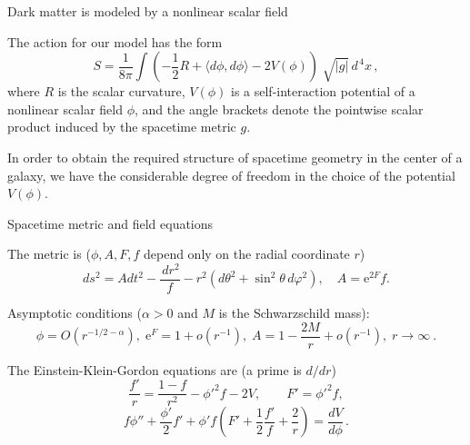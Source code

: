 \documentclass[12pt,aspectratio=139, slidestop,notes=hide]{beamer}
\begin{document}
\begin{frame}
{\centerline{Dark matter is modeled by a nonlinear scalar field\quad}}

\vspace{2ex}
The action for our model has the form
\begin{equation}\label{action}
    S=\frac{1}{8\pi}\int\left(-\frac{1}{2}R+ \langle d\phi,d\phi\rangle-2V(\phi)\right) \sqrt[]{|g|}\,d^{\,4}x\,,
\end{equation}
where $R$ is the scalar curvature, $V(\phi)$ is a self-interaction potential of a nonlinear scalar field $\phi$, and the angle brackets denote the pointwise scalar product induced by the spacetime metric $g$.

\vspace{2ex}
In order to obtain the required structure of spacetime geometry in the center of a galaxy, we have the considerable degree of freedom in the choice of the potential $V(\phi)$.

\end{frame}


\begin{frame}
{\centerline{Spacetime metric and field equations\quad}}

The metric is ($\phi, A, F, f$ depend only on the radial coordinate $r$)
\begin{equation}\label{metric}
    ds^2=A dt^2- \frac{\,dr^2}{f}- r^{2}(d\theta^2+\sin^{2}\!\theta\, d\varphi^2), \quad
    A=\mathrm{e}^{2F}\!f.
\end{equation}

Asymptotic conditions ($\alpha>0$ and $M$ is the Schwarzschild mass):
\begin{equation}\label{cond0}
\phi= O\!\left(r^{-1/2-\textstyle{\alpha}}\right)\!, \; \mathrm{e}^{F}\!\!=\!1+o\!\left(r^{-1}\right)\!, \; A\!=\!1-\frac{2M}{r}+ o\!\left(r^{-1}\right)\!, \; r\!\rightarrow\!\infty\!\:.
\end{equation}

The Einstein-Klein-Gordon equations are (a prime is $d/dr$)
\begin{equation}\label{EKG1}
\frac{f'}{r}=\frac{1-f}{r^2}-{\phi'}^2f - 2V,\qquad F'={\phi'}^2f,
\end{equation}
\begin{equation}\label{EKG3}
f\phi''+\frac{\phi'}{2}f'+\phi' f\left(\!F' +
\frac{1}{2}\frac{f'}{f}+\frac{2}{r}\right)= \frac{dV}{d\phi}\,.
\end{equation}

\end{frame}
\end{document}
